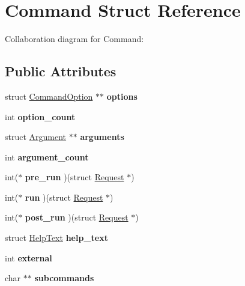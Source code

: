 \hypertarget{struct_command}{}\section{Command Struct Reference}
\label{struct_command}


Collaboration diagram for Command\+:
\subsection*{Public Attributes}
\begin{DoxyCompactItemize}
\item 
\mbox{\label{struct_command_aadf3757b34f84b2c6b99dd4c6edadbb4}} 
struct \mbox{\hyperlink{struct_command_option}{Command\+Option}} $\ast$$\ast$ {\bfseries options}
\item 
\mbox{\label{struct_command_a284495cc5ba8bda98ff01a50c0cb3a57}} 
int {\bfseries option\+\_\+count}
\item 
\mbox{\label{struct_command_ac77e5c01a10019168a4a8de61b602f8a}} 
struct \mbox{\hyperlink{struct_argument}{Argument}} $\ast$$\ast$ {\bfseries arguments}
\item 
\mbox{\label{struct_command_aa15ba44735df6b10e31c0ae77f3fb27f}} 
int {\bfseries argument\+\_\+count}
\item 
\mbox{\label{struct_command_a58d1289f88a5a956616edcc5a089eed4}} 
int($\ast$ {\bfseries pre\+\_\+run} )(struct \mbox{\hyperlink{struct_request}{Request}} $\ast$)
\item 
\mbox{\label{struct_command_aafe4582a7f08511833bc742a49b6bb84}} 
int($\ast$ {\bfseries run} )(struct \mbox{\hyperlink{struct_request}{Request}} $\ast$)
\item 
\mbox{\label{struct_command_aead6bb1a524890359e546a2de53c6721}} 
int($\ast$ {\bfseries post\+\_\+run} )(struct \mbox{\hyperlink{struct_request}{Request}} $\ast$)
\item 
\mbox{\label{struct_command_ad2b4f033dd129564d68ff3a1e256c71c}} 
struct \mbox{\hyperlink{struct_help_text}{Help\+Text}} {\bfseries help\+\_\+text}
\item 
\mbox{\label{struct_command_a28bb1edd8542c9644f8d5add2de3dc7e}} 
int {\bfseries external}
\item 
\mbox{\label{struct_command_a5200170e33b8042cec125cdaef8078f5}} 
char $\ast$$\ast$ {\bfseries subcommands}
\end{DoxyCompactItemize}


